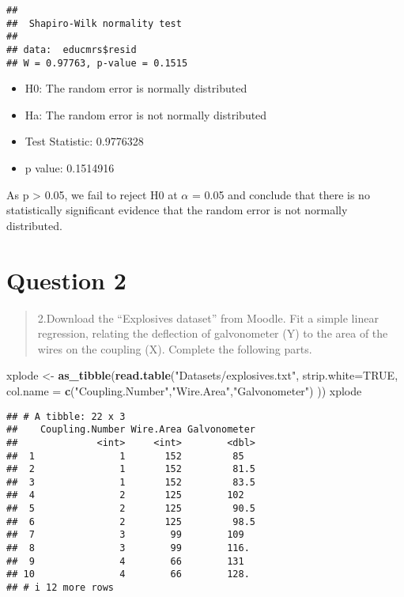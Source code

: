 \documentclass[
]{article}
\newenvironment{Shaded}{\begin{snugshade}}{\end{snugshade}}
\newcommand{\AttributeTok}[1]{\textcolor[rgb]{0.13,0.29,0.53}{#1}}
\newcommand{\ConstantTok}[1]{\textcolor[rgb]{0.56,0.35,0.01}{#1}}
\newcommand{\FunctionTok}[1]{\textcolor[rgb]{0.13,0.29,0.53}{\textbf{#1}}}
\newcommand{\NormalTok}[1]{#1}
\newcommand{\OtherTok}[1]{\textcolor[rgb]{0.56,0.35,0.01}{#1}}
\newcommand{\StringTok}[1]{\textcolor[rgb]{0.31,0.60,0.02}{#1}}
\begin{document}
\begin{verbatim}
## 
##  Shapiro-Wilk normality test
## 
## data:  educmrs$resid
## W = 0.97763, p-value = 0.1515
\end{verbatim}

\begin{itemize}
\item
  H0: The random error is normally distributed
\item
  Ha: The random error is not normally distributed
\item
  Test Statistic: 0.9776328
\item
  p value: 0.1514916
\end{itemize}

As p \textgreater{} 0.05, we fail to reject H0 at \(\alpha\) = 0.05 and
conclude that there is no statistically significant evidence that the
random error is not normally distributed.

\hypertarget{question-2}{%
\section{Question 2}\label{question-2}}

\begin{quote}
2.Download the ``Explosives dataset'' from Moodle. Fit a simple linear
regression, relating the deflection of galvonometer (Y) to the area of
the wires on the coupling (X). Complete the following parts.
\end{quote}

\begin{Shaded}
\begin{Highlighting}[]
\NormalTok{xplode }\OtherTok{\textless{}{-}} \FunctionTok{as\_tibble}\NormalTok{(}\FunctionTok{read.table}\NormalTok{(}\StringTok{"Datasets/explosives.txt"}\NormalTok{, }
            \AttributeTok{strip.white=}\ConstantTok{TRUE}\NormalTok{,}
            \AttributeTok{col.name =} \FunctionTok{c}\NormalTok{(}\StringTok{"Coupling.Number"}\NormalTok{,}\StringTok{"Wire.Area"}\NormalTok{,}\StringTok{"Galvonometer"}\NormalTok{)}
\NormalTok{            ))}
\NormalTok{xplode}
\end{Highlighting}
\end{Shaded}

\begin{verbatim}
## # A tibble: 22 x 3
##    Coupling.Number Wire.Area Galvonometer
##              <int>     <int>        <dbl>
##  1               1       152         85  
##  2               1       152         81.5
##  3               1       152         83.5
##  4               2       125        102  
##  5               2       125         90.5
##  6               2       125         98.5
##  7               3        99        109  
##  8               3        99        116. 
##  9               4        66        131  
## 10               4        66        128. 
## # i 12 more rows
\end{verbatim}
\end{document}
